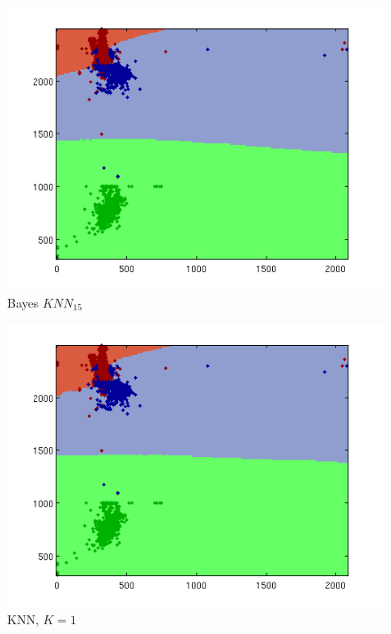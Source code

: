 \documentclass[a4paper]{article}
\begin{document}
\begin{figure}[htbp!]
\center
\includegraphics[clip, trim=40px 15px 30px 10px]{bayes_knn_real.png}
\caption{Bayes $KNN_{15}$}
\end{figure}

\begin{figure}[htbp!]
\center
\includegraphics[clip, trim=40px 15px 30px 10px]{knn_real.png}
\caption{KNN, $K=1$}
\end{figure}
\end{document}

